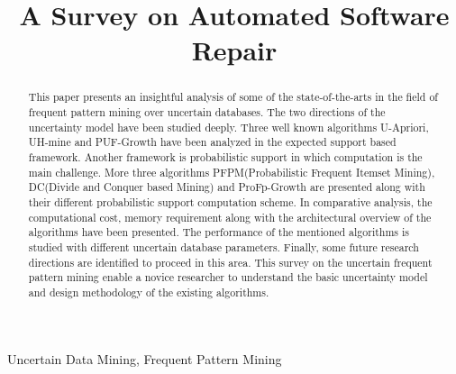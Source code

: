 \documentclass[10pt, conference, compsocconf]{IEEEtran}
\begin{document}
\title{A Survey on Automated Software Repair}

\author{


}

\maketitle
\thispagestyle{plain}
\pagestyle{plain}

\begin{abstract}
This paper presents an insightful analysis of some of the state-of-the-arts in the field of frequent pattern mining over uncertain databases. The two directions of the uncertainty model have been studied deeply. Three well known algorithms U-Apriori, UH-mine and PUF-Growth have been analyzed in the expected support based framework. Another framework is probabilistic support in which computation is the main challenge. More three algorithms PFPM(Probabilistic Frequent Itemset Mining), DC(Divide and Conquer based Mining) and ProFp-Growth are presented along with their different probabilistic support computation scheme. In comparative analysis, the computational cost, memory requirement along with the architectural overview of the algorithms have been presented. The performance of the mentioned algorithms is studied with different uncertain database parameters. Finally, some future research directions are identified to proceed in this area. This survey on the uncertain frequent pattern mining enable a novice researcher to understand the basic uncertainty model and design methodology of the existing algorithms.


\end{abstract}

\begin{IEEEkeywords}
Uncertain Data Mining, Frequent Pattern Mining

\end{IEEEkeywords}


%
\IEEEpeerreviewmaketitle



%
%
%




\end{document}
